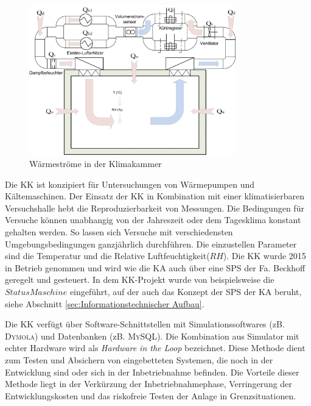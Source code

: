 \begin{figure}[htb]
\centering		\includegraphics[width=0.80\textwidth]{Pictures/KK.png}
\caption{Wärmeströme in der Klimakammer \citep{Chen2013}}
\label{fig:KK}
\end{figure}

Die KK ist konzipiert für  Untersuchungen von Wärmepumpen und Kältemaschinen. Der Einsatz der KK in Kombination mit einer klimatisierbaren Versuchshalle hebt die Reproduzierbarkeit von Messungen. Die Bedingungen für Versuche können unabhangig von der Jahreszeit oder dem Tagesklima konstant gehalten werden. So lassen sich Versuche mit verschiedensten Umgebungsbedingungen ganzjährlich durchführen.  Die einzustellen Parameter sind die Temperatur und die Relative Luftfeuchtigkeit($RH$). Die KK wurde 2015 in Betrieb genommen und wird wie die KA auch über eine SPS der Fa. Beckhoff geregelt und gesteuert. In dem KK-Projekt wurde von \textsc{\citeauthor{Nuerenberg2015}} beispielsweise die $Status Maschine$ eingeführt, auf der auch das Konzept der SPS der KA beruht, siehe Abschnitt \ref{sec:Informationstechnischer Aufbau}. 

Die KK verfügt über Software-Schnittstellen  mit Simulationssoftwares (zB. \textsc{Dymola}) und Datenbanken (zB. \textsc{MySQL}). Die Kombination aus Simulator mit echter Hardware wird als \textit{Hardware in the Loop} bezeichnet. Diese Methode dient zum Testen und Absichern von eingebetteten Systemen, die noch in der Entwicklung sind oder sich in der Inbetriebnahme befinden. Die Vorteile dieser Methode liegt in der Verkürzung der Inbetriebnahmephase, Verringerung der Entwicklungskosten und das riskofreie Testen der Anlage in Grenzsituationen. \citep{OPALRTT2014}


